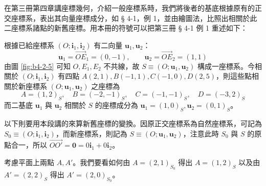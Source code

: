 \begin{example}[論例 1]
在第三冊第四章講座標幾何，介紹一般座標系時，我們將後者的基底根據原有的正交座標系，表出其向量座標成分，如 § 4-1，例 1，並由繪圖法，比照出相關於此二座標系諸點的新舊座標。用本冊的符號可以把第三冊 § 4-1 例 1 重述如下：

根據已給座標系 $(O; \mathbf{i}_1, \mathbf{i}_2)$ 有二向量 $\mathbf{u}_1, \mathbf{u}_2$：
\[ \mathbf{u}_1 = \vec{OE}_1 = (0, -1), \qquad \mathbf{u}_2 = \vec{OE}_2 = (1, 1) \]
由圖 \ref{fig:b4-2-5} 可知 $O, E_1, E_2$ 不共線，故 $S \equiv (O; \mathbf{u}_1, \mathbf{u}_2)$ 構成一座標系。今相關於 $(O; \mathbf{i}_1, \mathbf{i}_2)$ 有四點 $A(2, 1), B(-1, 1), C(-1, 0), D(2, 5)$，則這些點相關於新座標系 $(O; \mathbf{u}_1, \mathbf{u}_2)$ 之座標為
\[ A = (1, 2)_S, \quad B = (-2, -1)_S, \quad C = (-1, -1)_S, \quad D = (-3, 2)_S \]
而二基底 $\mathbf{u}_1$ 與 $\mathbf{u}_2$ 相關於 $S$ 的座標成分為 $\mathbf{u}_1 = (1, 0)_S, \mathbf{u}_2 = (0, 1)_S$。

以下則要用本段講的來算新舊座標的變換。因原正交座標系為自然座標系，可記為 $S_0 \equiv (O; \mathbf{i}_1, \mathbf{i}_2)$，而新座標系，則記為 $S \equiv (O; \mathbf{u}_1, \mathbf{u}_2)$，注意此時 $S_0$ 與 $S$ 的原點合一，所以 $\vec{OO'} = \mathbf{0} = 0\mathbf{i}_1 + 0\mathbf{i}_2$。

考慮平面上兩點 $A, A'$。我們要看如何由 $A = (2, 1)_{S_0}$ 得出 $A = (1, 2)_S$ 以及由 $A' = (2, 2)_S$ 得出 $A' = (2, 0)_{S_0}$。
\end{example}

